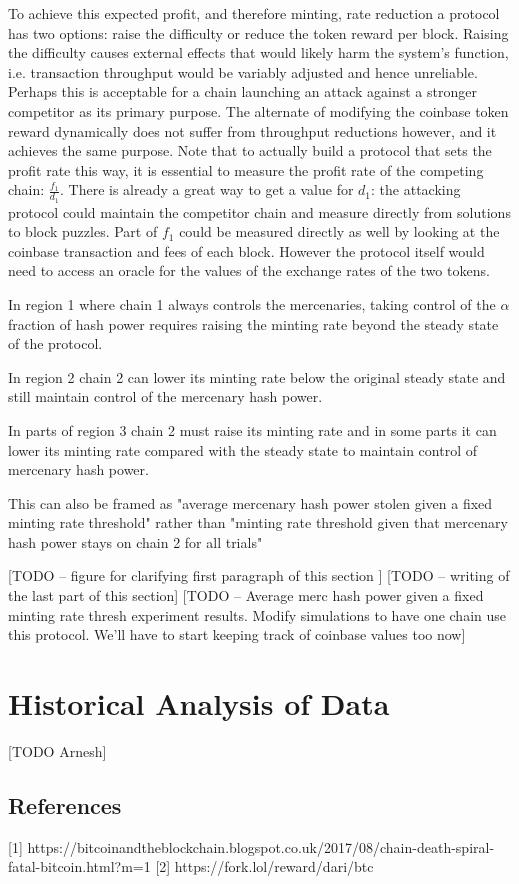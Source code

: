 \documentclass[10pt, preprint]{aastex}
\begin{document}
To achieve this expected profit, and therefore minting, rate reduction a protocol has two options: raise the difficulty or reduce the token reward per block.  Raising the difficulty causes external effects that would likely harm the system's function, i.e. transaction throughput would be variably adjusted and hence unreliable.  Perhaps this is acceptable for a chain launching an attack against a stronger competitor as its primary purpose.  The alternate of modifying the coinbase token reward dynamically does not suffer from throughput reductions however, and it achieves the same purpose.  Note that to actually build a protocol that sets the profit rate this way, it is essential to measure the profit rate of the competing chain: $\frac{f_1}{d_1}$.  There is already a great way to get a value for $d_1$: the attacking protocol could maintain the competitor chain and measure directly from solutions to block puzzles.  Part of $f_1$ could be measured directly as well by looking at the coinbase transaction and fees of each block.  However the protocol itself would need to access an oracle for the values of the exchange rates of the two tokens.

In region 1 where chain 1 always controls the mercenaries, taking control of the $\alpha$ fraction of hash power requires raising the minting rate beyond the steady state of the protocol.

In region 2 chain 2 can lower its minting rate below the original steady state and still maintain control of the mercenary hash power.

In parts of region 3 chain 2 must raise its minting rate and in some parts it can lower its minting rate compared with the steady state to maintain control of mercenary hash power.

This can also be framed as "average mercenary hash power stolen given a fixed minting rate threshold" rather than "minting rate threshold given that mercenary hash power stays on chain 2 for all trials"

[TODO -- figure for clarifying first paragraph of this section ]
[TODO -- writing of the last part of this section]
[TODO -- Average merc hash power given a fixed minting rate thresh experiment results.  Modify simulations to have one chain use this protocol.  We'll have to start keeping track of coinbase values too now]


\section{Historical Analysis of Data}
[TODO Arnesh]



\subsection{References}
[1] https://bitcoinandtheblockchain.blogspot.co.uk/2017/08/chain-death-spiral-fatal-bitcoin.html?m=1
[2] https://fork.lol/reward/dari/btc
\end{document}
